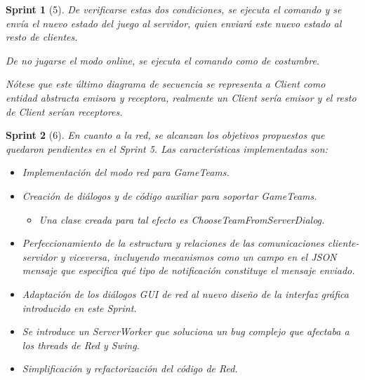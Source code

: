 \documentclass[12pt,a4paper,openright]{book}
\theoremstyle{break}
\newtheorem*{sprint}{Sprint}
\begin{document}
\begin{sprint}[5]
De verificarse estas dos condiciones, se ejecuta el comando y se envía el nuevo estado del juego al servidor, quien enviará este nuevo estado al resto de clientes.

De no jugarse el modo online, se ejecuta el comando como de costumbre.

Nótese que este último diagrama de secuencia se representa a Client como entidad abstracta emisora y receptora, realmente un Client sería emisor y el resto de Client serían receptores.
\end{sprint}

\begin{sprint}[6]
En cuanto a la red, se alcanzan los objetivos propuestos que quedaron pendientes en el Sprint 5. Las características implementadas son:

\begin{itemize}
\item Implementación del modo red para GameTeams.

\item Creación de diálogos y de código auxiliar para soportar GameTeams.

\begin{itemize}
\item Una clase creada para tal efecto es ChooseTeamFromServerDialog.
\end{itemize}


\item Perfeccionamiento de la estructura y relaciones de las comunicaciones cliente-servidor y viceversa, incluyendo mecanismos como un campo en el JSON mensaje que especifica qué tipo de notificación constituye el mensaje enviado.

\item Adaptación de los diálogos GUI de red al nuevo diseño de la interfaz gráfica introducido en este Sprint.

\item Se introduce un ServerWorker que soluciona un bug complejo que afectaba a los threads de Red y Swing.

\item Simplificación y refactorización del código de Red.


\end{itemize}
\end{sprint}
\end{document}
